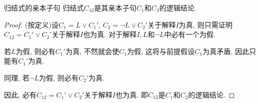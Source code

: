 \begin{mythm}{归结式的亲本子句}{}\label{AIthm3.1}
    归结式$C_{12}$是其亲本子句$C_1 $和$C_2$的逻辑结论.
\end{mythm}
\begin{proof}
(按定义)设$C_1 =L\vee C_1 '$, $C_2 =\neg L\vee C_2 '$关于解释$I$为真, 则只需证明$C_{1 2}= C_1' \vee C_2 '$关于解释$I$也为真.
对于解释$I, L$和$\neg L$中必有一个为假.

若$L$为假, 则必有$C_1'$为真, 不然就会使$C_1$为假, 这将与前提假设$C_1$为真矛盾, 因此只能有$C_1'$为真.

同理, 若$\neg L$为假, 则必有$C_2'$为真.

因此, 必有$C_{1 2}= C_1 '\vee C_2 '$关于解释$I$也为真. 即$C_{12}$是$C_1$和$C_2$的逻辑结论.
\end{proof}

